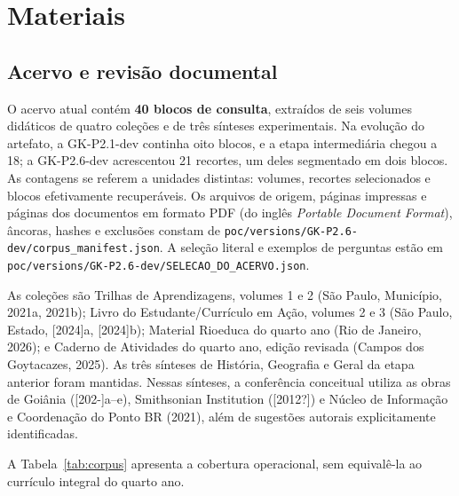 \section{Materiais}

\subsection{Acervo e revisão documental}

O acervo atual contém \textbf{40 blocos de consulta}, extraídos de seis volumes didáticos de quatro coleções e de três sínteses experimentais. Na evolução do artefato, a GK-P2.1-dev continha oito blocos, e a etapa intermediária chegou a 18; a GK-P2.6-dev acrescentou 21 recortes, um deles segmentado em dois blocos. As contagens se referem a unidades distintas: volumes, recortes selecionados e blocos efetivamente recuperáveis. Os arquivos de origem, páginas impressas e páginas dos documentos em formato PDF (do inglês \textit{Portable Document Format}), âncoras, hashes e exclusões constam de \nolinkurl{poc/versions/GK-P2.6-dev/corpus_manifest.json}. A seleção literal e exemplos de perguntas estão em \nolinkurl{poc/versions/GK-P2.6-dev/SELECAO_DO_ACERVO.json}.

As coleções são Trilhas de Aprendizagens, volumes 1 e 2 (São Paulo, Município, 2021a, 2021b); Livro do Estudante/Currículo em Ação, volumes 2 e 3 (São Paulo, Estado, [2024]a, [2024]b); Material Rioeduca do quarto ano (Rio de Janeiro, 2026); e Caderno de Atividades do quarto ano, edição revisada (Campos dos Goytacazes, 2025). As três sínteses de História, Geografia e Geral da etapa anterior foram mantidas. Nessas sínteses, a conferência conceitual utiliza as obras de Goiânia ([202-]a--e), Smithsonian Institution ([2012?]) e Núcleo de Informação e Coordenação do Ponto BR (2021), além de sugestões autorais explicitamente identificadas.

A Tabela~\ref{tab:corpus} apresenta a cobertura operacional, sem equivalê-la ao currículo integral do quarto ano.

